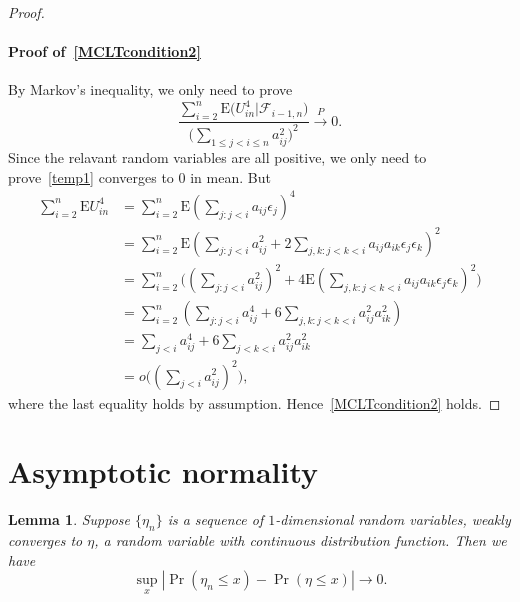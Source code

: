 \documentclass[review]{elsarticle}
\theoremstyle{plain}
\newtheorem{lemma}{Lemma}
\theoremstyle{definition}
\theoremstyle{remark}
\begin{document}
\begin{proof}
     \paragraph{Proof of~\eqref{MCLTcondition2}}
     By Markov's inequality, we only need to prove
     \begin{equation}\label{temp1}
         \frac{\sum_{i=2}^n \mathrm{E}\big(U_{in}^4\big|\mathcal{F}_{i-1,n}\big)}{{\big(\sum_{1\leq j<i\leq n} a_{ij}^2\big)}^2}\xrightarrow{P} 0.
     \end{equation}
     Since the relavant random variables are all positive, we only need to prove~\eqref{temp1} converges to $0$ in mean. But
     \begin{equation*}
         \begin{aligned}
         \sum_{i=2}^n \mathrm{E} U_{in}^4
             &=
             \sum_{i=2}^n \mathrm{E} {(\sum_{j:j<i}a_{ij}\epsilon_j)}^4\\
             &=
             \sum_{i=2}^n \mathrm{E} {(\sum_{j:j<i}a_{ij}^2+2\sum_{j,k:j<k<i}a_{ij}a_{ik}\epsilon_j \epsilon_k)}^2\\
             &=
             \sum_{i=2}^n  \big({(\sum_{j:j<i}a_{ij}^2)}^2+4\mathrm{E}{(\sum_{j,k:j<k<i}a_{ij}a_{ik}\epsilon_j \epsilon_k)}^2 \big)\\
             &=
             \sum_{i=2}^n  (\sum_{j:j<i}a_{ij}^4+6\sum_{j,k:j<k<i}a_{ij}^2 a_{ik}^2)\\
             &=
             \sum_{j<i}a_{ij}^4+6\sum_{j<k<i}a_{ij}^2 a_{ik}^2\\
             &=
             o\big({(\sum_{j<i} a_{ij}^2)}^2\big),
         \end{aligned}
     \end{equation*}
     where the last equality holds by assumption. Hence~\eqref{MCLTcondition2} holds.
 \end{proof}

\section{Asymptotic normality}
\begin{lemma}\label{lemmaUniformSimple}
    Suppose $\{\eta_n\}$ is a sequence of $1$-dimensional random variables, weakly converges to $\eta$, a random variable with continuous distribution function.
    Then we have
    $$
    \sup_{x}|\Pr(\eta_n\leq x)-\Pr(\eta\leq x)|\to 0.
    $$
\end{lemma}
\end{document}
